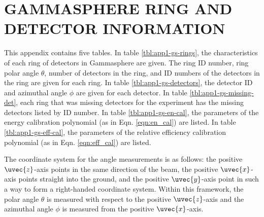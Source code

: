 %
%

\chapter{GAMMASPHERE RING AND DETECTOR INFORMATION}
\label{app:gs-rings-and-detectors}
This appendix contains five tables. In table \ref{tbl:app1-gs-rings}, the characteristics of each ring of detectors in Gammasphere are given. The ring ID number, ring polar angle $\theta$, number of detectors in the ring, and ID numbers of the detectors in the ring are given for each ring. In table \ref{tbl:app1-gs-detectors}, the detector ID and azimuthal angle $\phi$ are given for each detector. In table \ref{tbl:app1-gs-missing-det}, each ring that was missing detectors for the experiment has the missing detectors listed by ID number. In table \ref{tbl:app1-gs-en-cal}, the parameters of the energy calibration polynomial (as in Eqn. \ref{eqn:en_cal}) are listed. In table \ref{tbl:app1-gs-eff-cal}, the parameters of the relative efficiency calibration polynomial (as in Eqn. \ref{eqn:eff_cal}) are listed.

The coordinate system for the angle measurements is as follows: the positive $\uvec{z}$-axis points in the same direction of the beam, the positive $\uvec{x}$-axis points straight into the ground, and the positive $\uvec{y}$-axis point in such a way to form a right-handed coordinate system. Within this framework, the polar angle $\theta$ is measured with respect to the positive $\uvec{z}$-axis and the azimuthal angle $\phi$ is measured from the positive $\uvec{x}$-axis.


